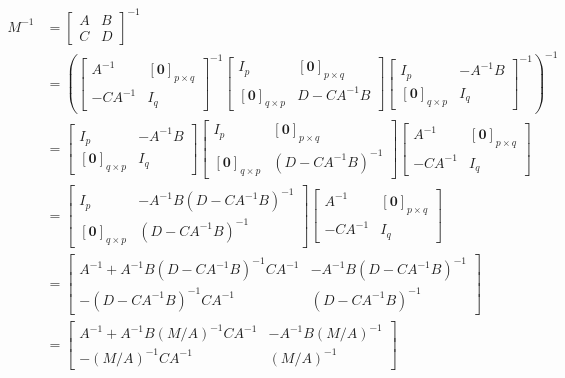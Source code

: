 \begin{align*}
M^{-1} &=
\begin{bmatrix}
A & B \\
C & D
\end{bmatrix}^{-1} \\
&= \left(\begin{bmatrix}
A^{-1} & [\textbf{0}]_{p\times q} \\
-CA^{-1} & I_q
\end{bmatrix}^{-1}
\begin{bmatrix}
I_p & [\textbf{0}]_{p \times q} \\
[\textbf{0}]_{q\times p} & D - CA^{-1}B 
\end{bmatrix}
\begin{bmatrix}
I_p & -A^{-1}B \\
[\textbf{0}]_{q \times p} & I_q
\end{bmatrix}^{-1} \right)^{-1} \\
&=
\begin{bmatrix}
I_p & -A^{-1}B \\
[\textbf{0}]_{q \times p} & I_q
\end{bmatrix} 
\begin{bmatrix}
I_p & [\textbf{0}]_{p \times q} \\
[\textbf{0}]_{q\times p} & (D - CA^{-1}B)^{-1}
\end{bmatrix}
\begin{bmatrix}
A^{-1} & [\textbf{0}]_{p\times q} \\
-CA^{-1} & I_q
\end{bmatrix} \\
&=
\begin{bmatrix}
I_p & -A^{-1}B (D - CA^{-1}B)^{-1} \\
[\textbf{0}]_{q \times p} & (D - CA^{-1}B)^{-1}
\end{bmatrix}
\begin{bmatrix}
A^{-1} & [\textbf{0}]_{p\times q} \\
-CA^{-1} & I_q
\end{bmatrix} \\
&= \begin{bmatrix}
A^{-1} + A^{-1}B (D - CA^{-1}B)^{-1} CA^{-1} & -A^{-1}B (D - CA^{-1}B)^{-1} \\
-(D - CA^{-1}B)^{-1}CA^{-1} & (D - CA^{-1}B)^{-1}
\end{bmatrix} \\
&= \begin{bmatrix}
A^{-1} + A^{-1}B (M/A)^{-1} CA^{-1} & -A^{-1}B (M/A)^{-1} \\
-(M/A)^{-1}CA^{-1} & (M/A)^{-1}
\end{bmatrix}
\end{align*}
